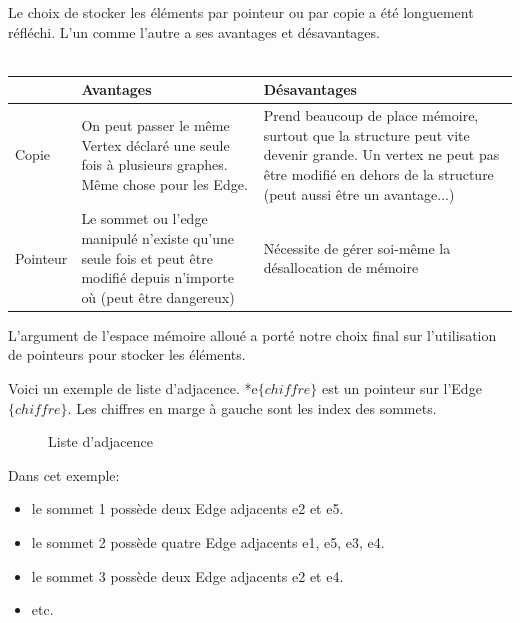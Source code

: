 \documentclass[french]{article}
\begin{document}
			Le choix de stocker les éléments par pointeur ou par copie a été longuement réfléchi. L'un comme l'autre a ses avantages et désavantages.\\ \\
			\begin{tabular}{p{}|p{0.4\textwidth}|p{}}
				 &Avantages&Désavantages\\
				\hline
				Copie& On peut passer le même Vertex déclaré une seule fois à plusieurs graphes. Même chose pour les Edge. & Prend beaucoup de place mémoire, surtout que la structure peut vite devenir grande. Un vertex ne peut pas être modifié en dehors de la structure (peut aussi être un avantage...)\\
				\hline
				Pointeur& Le sommet ou l'edge manipulé n'existe qu'une seule fois et peut être modifié depuis n'importe où (peut être dangereux) & Nécessite de gérer soi-même la désallocation de mémoire \\
			\end{tabular}
			
			L'argument de l'espace mémoire alloué a porté notre choix final sur l'utilisation de pointeurs pour stocker les éléments.			
		
			Voici un exemple de liste d'adjacence. *e$\{chiffre\}$ est un pointeur sur l'Edge $\{chiffre\}$. Les chiffres en marge à gauche sont les index des sommets.
			\begin{figure}[H]
				\centering
				\caption{Liste d'adjacence}
			\end{figure}
			Dans cet exemple:
			\begin{itemize}
				\item le sommet 1 possède deux Edge adjacents e2 et e5.
				\item le sommet 2 possède quatre Edge adjacents e1, e5, e3, e4.
				\item le sommet 3 possède deux Edge adjacents e2 et e4.
				\item etc.
			\end{itemize}
			
\end{document}
